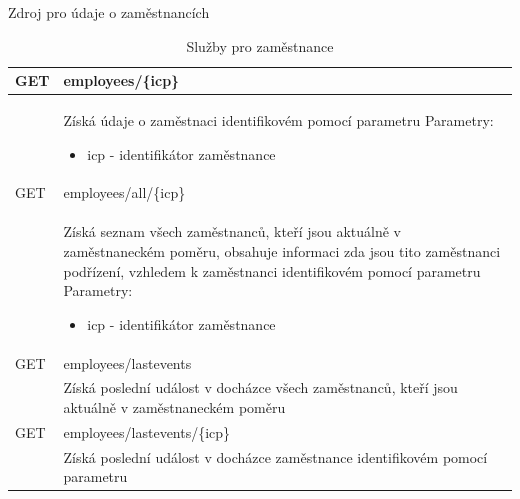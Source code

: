 \documentclass{bakalarka}
\begin{document}
\noindent
Zdroj pro údaje o zaměstnancích
\begin{table}[H]
\begin{center}
\begin{tabular}{| m{2cm} |  m{10cm} |}
\hline
\rowcolor{Gray}
GET  & employees/\{icp\} \\ \hline
&  \parbox{10cm}{Získá údaje o zaměstnaci identifikovém pomocí parametru\\
Parametry:\begin{itemize}[noitemsep,nolistsep]
\item icp - identifikátor zaměstnance
\end{itemize}} \\ \hline
\hline
{}
GET  & employees/all/\{icp\} \\ \hline
&  \parbox{10cm}{Získá seznam všech zaměstnanců, kteří jsou aktuálně v zaměstnaneckém poměru, obsahuje informaci zda jsou tito zaměstnanci podřízení, vzhledem k zaměstnanci identifikovém pomocí parametru\\
Parametry:\begin{itemize}[noitemsep,nolistsep]
\item icp - identifikátor zaměstnance
\end{itemize}} \\ \hline
{}
GET  & employees/lastevents \\ 
&  \parbox{10cm}{Získá poslední událost v docházce všech zaměstnanců, kteří jsou aktuálně v zaměstnaneckém poměru}\\
\hline
{}
GET  & employees/lastevents/\{icp\} \\ 
&  \parbox{10cm}{Získá poslední událost v docházce zaměstnance identifikovém pomocí parametru}\\
\hline
\end{tabular}
\end{center}
\caption{Služby pro zaměstnance}
\label{tab:uriemps}
\end{table}
\noindent
\end{document}
